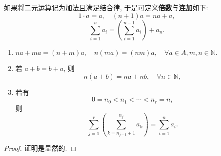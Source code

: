 \documentclass[../../main.tex]{subfiles}%
\begin{document}
\begin{definition}\label{definition:倍数的定义}
如果将二元运算记为加法且满足结合律, 于是可定义\textbf{倍数}与\textbf{连加}如下:
\[
1 \cdot a = a,\quad (n + 1)a = na + a,
\]
\[
\sum_{i = 1}^n a_i = \left( \sum_{i = 1}^{n - 1} a_i \right) + a_n.
\]
\end{definition}

\begin{proposition}\label{proposition:倍数和连加的性质}
\begin{enumerate}
\item $na + ma = (n + m)a,\quad n(ma) = (nm)a,\quad \forall a \in A, m,n \in \mathbb{N}.$

\item 若 \( a + b = b + a \), 则
\[
n(a + b) = na + nb,\quad \forall n \in \mathbb{N},
\]

\item 若有
\[
0 = n_0 < n_1 < \cdots < n_r = n,
\]
则
\[
\sum_{j = 1}^r \left( \sum_{k = n_{j - 1} + 1}^{n_j} a_k \right) = \sum_{i = 1}^n a_i.
\]
\end{enumerate}
\end{proposition}
\begin{proof}
证明是显然的.
\end{proof}
\end{document}

